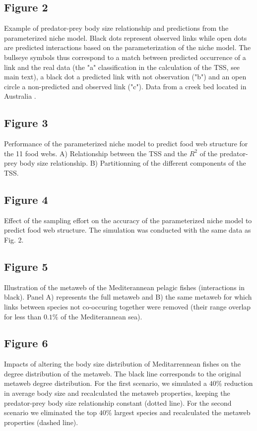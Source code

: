 \documentclass[12pt]{article}
\begin{document}
\subsection*{Figure 2}
Example of predator-prey body size relationship and predictions from the parameterized niche model. Black dots represent observed links while open dots are predicted interactions based on the parameterization of the niche model. The bullseye symbols thus correspond to a match between predicted occurrence of a link and the real data (the "a" classification in the calculation of the TSS, see main text), a black dot a predicted link with not observation ("b") and an open circle a non-predicted and observed link ("c"). Data from a creek bed located in Australia \parencite{Brose2005}. 

\subsection*{Figure 3}
Performance of the parameterized niche model to predict food web structure for the 11 food webs. A) Relationship between the TSS and the $R^2$ of the predator-prey body size relationship. B) Partitionning of the different components of the TSS.  	

\subsection*{Figure 4}
Effect of the sampling effort on the accuracy of the parameterized niche model to predict food web structure. The simulation was conducted with the same data as Fig. 2.

\subsection*{Figure 5}
Illustration of the metaweb of the Mediterannean pelagic fishes (interactions in black). Panel A) represents the full metaweb and B) the same metaweb for which links between species not co-occuring together were removed (their range overlap for less than $0.1\%$ of the Mediterannean sea). 

\subsection*{Figure 6}
Impacts of altering the body size distribution of Meditarrennean fishes on the degree distribution of the metaweb. The black line corresponds to the original metaweb degree distribution. For the first scenario, we simulated a $40\%$ reduction in average body size and recalculated the metaweb properties, keeping the predator-prey body size relationship constant (dotted line). For the second scenario we eliminated the top $40\%$ largest species and recalculated the metaweb properties (dashed line).   
\end{document}
